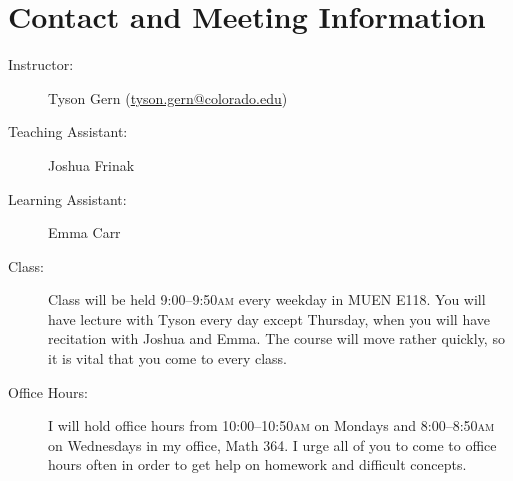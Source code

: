 \documentclass[11pt]{article}
\begin{document}
\drawtitle

\section*{Contact and Meeting Information}

\begin{description}
\item[Instructor:] Tyson Gern
  (\href{mailto:tyson.gern@colorado.edu}{tyson.gern@colorado.edu})
\item[Teaching Assistant:] Joshua Frinak
\item[Learning Assistant:] Emma Carr
\item[Class:] Class will be held 9:00--9:50\textsc{am} every weekday in
  MUEN E118.  You will have lecture with Tyson every day except
  Thursday, when you will have recitation with Joshua and Emma.  The
  course will move rather quickly, so it is vital that you come to
  every class.
\item[Office Hours:] I will hold office hours from
  10:00--10:50\textsc{am} on Mondays and 8:00--8:50\textsc{am} on
  Wednesdays in my office, Math 364.  I urge all of you to come to
  office hours often in order to get help on homework and difficult
  concepts.
\end{description}
\end{document}
